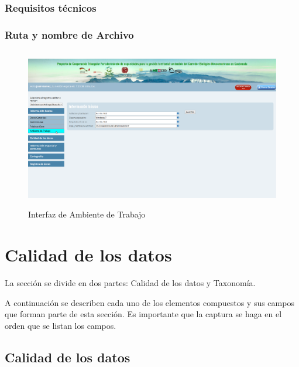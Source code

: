 \documentclass[twoside]{book}
\begin{document}
\subsection{Requisitos técnicos}

\subsection{Ruta y nombre de Archivo}



\begin{figure}[h] %
	\includegraphics[width=12cm, height=7cm]{img/software} %
	\caption{Interfaz de Ambiente de Trabajo}
\end{figure}









\chapter{Calidad de los datos}

La sección se divide en dos partes: Calidad de los datos y Taxonomía.

A continuación se describen cada uno de los elementos compuestos y sus campos que forman parte de esta sección. Es importante que la captura se haga en el orden que se listan los campos.
\section{Calidad de los datos}
\end{document}
